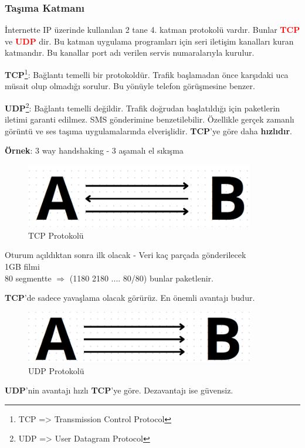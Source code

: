 \subsubsection{Taşıma Katmanı}\label{subsubsec:tasima_katmani}
İnternette IP üzerinde kullanılan 2 tane 4. katman protokolü vardır.
Bunlar \textcolor{red}{\textbf{TCP}} ve \textcolor{red}{\textbf{UDP}} dir.
Bu katman uygulama programları için seri iletişim kanalları kuran katmandır.
Bu kanallar port adı verilen servis numaralarıyla kurulur.

\textbf{TCP}\footnote{TCP => Transmission Control Protocol}: Bağlantı temelli bir protokoldür. Trafik başlamadan önce karşıdaki uca müsait olup olmadığı sorulur.
Bu yönüyle telefon görüşmesine benzer.

\textbf{UDP}\footnote{UDP => User Datagram Protocol}: Bağlantı temelli değildir. Trafik doğrudan başlatıldığı için paketlerin iletimi garanti edilmez.
SMS gönderimine benzetilebilir. Özellikle gerçek zamanlı görüntü ve ses taşıma uygulamalarında elverişlidir.
\textbf{TCP}'ye göre daha \textbf{hızlıdır}.

\textbf{Örnek}: 3 way handshaking - 3 aşamalı el sıkışma
\begin{figure}[ht]
	\centering
	\includegraphics[width=10cm]{images/tcp_example}
	\caption{TCP Protokolü}
	\label{fig:tcp_example}
\end{figure}
Oturum açıldıktan sonra ilk olacak
- Veri kaç parçada gönderilecek \\
1GB filmi \\
80 segmentte $\Rightarrow$ (1180 2180 .... 80/80) bunlar paketlenir.

\textbf{TCP}'de sadece yavaşlama olacak görürüz.
En önemli avantajı budur.

\begin{figure}[ht]
	\centering
	\includegraphics[width=10cm]{images/upd_example}
	\caption{UDP Protokolü}
	\label{fig:upd_example}
\end{figure}
\textbf{UDP}'nin avantajı hızlı  \textbf{TCP}'ye göre. Dezavantajı ise güvensiz.

